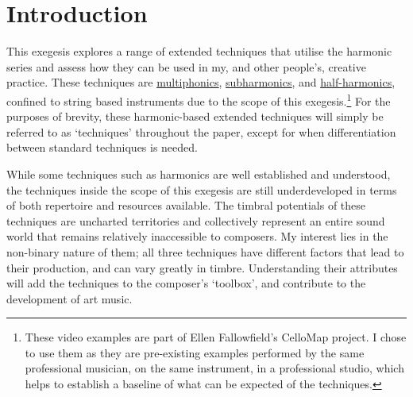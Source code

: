\section{Introduction}


\doublespace{}

This exegesis explores a range of extended techniques that utilise the harmonic series and assess how they can be used in my, and other people's, creative practice. 
These techniques are \underline{\textcolor{blue}{\href{https://vimeo.com/81380931}{multiphonics}}}, \underline{\textcolor{blue}{\href{https://vimeo.com/57219720}{subharmonics}}}, and \underline{\textcolor{blue}{\href{https://vimeo.com/92221539}{half-harmonics}}}, confined to string based instruments due to the scope of this exegesis.\footnote{These video examples are part of Ellen Fallowfield's CelloMap project. I chose to use them as they are pre-existing examples performed by the same professional musician, on the same instrument, in a professional studio, which helps to establish a baseline of what can be expected of the techniques.}
For the purposes of brevity, these harmonic-based extended techniques will simply be referred to as `techniques' throughout the paper, except for when differentiation between standard techniques is needed.

While some techniques such as harmonics are well established and understood, the techniques inside the scope of this exegesis are still underdeveloped in terms of both repertoire and resources available. 
The timbral potentials of these techniques are uncharted territories and collectively represent an entire sound world that remains relatively inaccessible to composers.
My interest lies in the non-binary nature of them; all three techniques have different factors that lead to their production, and can vary greatly in timbre. 
Understanding their attributes will add the techniques to the composer's `toolbox', and contribute to the development of art music.
% 



